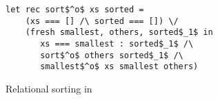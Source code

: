 \begin{figure}[h!]
  \centering
    \begin{lstlisting}[frame=tb]
  let rec sort$^o$ xs sorted =
    (xs === [] /\ sorted === []) \/
    (fresh smallest, others, sorted$_1$ in
       xs === smallest : sorted$_1$ /\
       sort$^o$ others sorted$_1$ /\
       smallest$^o$ xs smallest others)
    \end{lstlisting}
  \caption{Relational sorting in \mk}
  \label{fig:sorto}
\end{figure}
